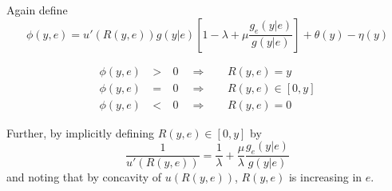 	Again define 
	\[
		\phi(y,e) = u'(R(y,e))g(y|e)\left[1-\lambda+\mu \frac{g_e(y|e)}{g(y|e)}\right]  + \theta(y)-\eta(y)
	\]
				
	\begin{subequations}
		\label{eq:KT-analysis-ra}
		\begin{alignat}{3}
			\phi(y,e) & \: > \: & 0 & \enspace \Rightarrow &   & \enspace R(y,e)=y \label{subeq:large-y-ra}           \\
			\phi(y,e) & \: = \: & 0 & \enspace \Rightarrow &   & \enspace R(y,e)\in [0,y] \label{subeq:interval-y-ra} \\
			\phi(y,e) & \: < \: & 0 & \enspace \Rightarrow &   & \enspace R(y,e) =0 \label{subeq:small-y-ra}          
		\end{alignat}
	\end{subequations}
				
	Further, by implicitly defining $R(y,e)\in[0,y]$ by 
	\[
		\frac{1}{u'(R(y,e))}=\frac{1}{\lambda}+\frac{\mu}{\lambda}\frac{g_e(y|e)}{g(y|e)}
	\]
	and noting that by concavity of $u(R(y,e))$, $R(y,e)$ is increasing in $e$. 
	\printbibliography%
	\listoftodos%
